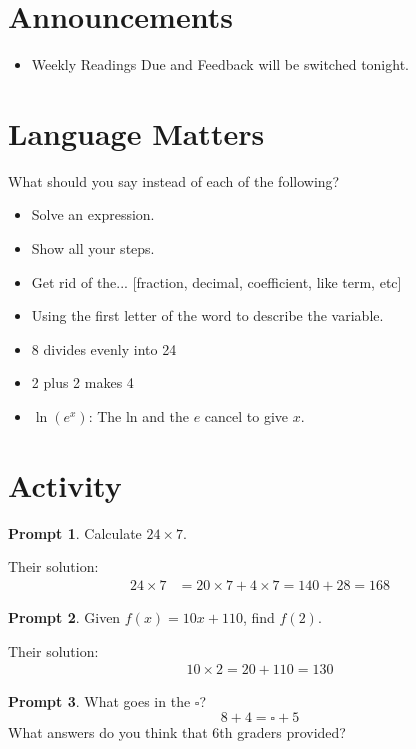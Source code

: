 \documentclass[11pt]{article}
\theoremstyle{definition}\newtheorem{definition}{Definition}
\theoremstyle{definition}\newtheorem{question}{Question}
\theoremstyle{definition}\newtheorem*{solution}{Solution}
\theoremstyle{definition}\newtheorem{example}{Example}
\theoremstyle{definition}\newtheorem{notation}{Notation}
\theoremstyle{theorem}\newtheorem{theorem}{Theorem}
\theoremstyle{theorem}\newtheorem{corollary}{Corollary}
\theoremstyle{theorem}\newtheorem{lemma}{Lemma}
\theoremstyle{theorem}\newtheorem{proposition}{Proposition}
\theoremstyle{theorem}\newtheorem{prompt}{Prompt}
\begin{document}
\section{Announcements}

\begin{itemize}
    \item Weekly Readings Due and Feedback will be switched tonight.
\end{itemize}

\section{Language Matters}

What should you say instead of each of the following?
\begin{itemize}
    \item Solve an expression.
    \item Show all your steps.
    \item Get rid of the... [fraction, decimal, coefficient, like term, etc]
    \item Using the first letter of the word to describe the variable.
    \item 8 divides evenly into 24
    \item 2 plus 2 makes 4
    \item $\ln(e^x)$: The ln and the $e$ cancel to give $x$.
\end{itemize}

\section{Activity}

\begin{prompt}
    Calculate $24 \times 7$.
\end{prompt}

Their solution:
\begin{align*}
    24 \times 7 &= 20 \times 7 + 4 \times 7 = 140 + 28 = 168
\end{align*}

\begin{prompt}
    Given $f(x) = 10x + 110$, find $f(2)$.
\end{prompt}

Their solution:
\begin{align*}
    10 \times 2 = 20 + 110 = 130
\end{align*}

\begin{prompt}
    What goes in the $\square$?
    \begin{equation*}
        8 + 4 = \square + 5
    \end{equation*}
    What answers do you think that 6th graders provided?
\end{prompt}
\end{document}
